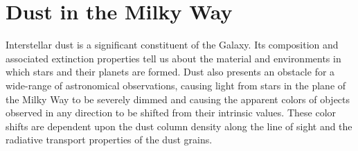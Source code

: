 %
%
%
%
%
%
%

\section{Dust in the Milky Way}
\def\secname{MW_Dust}\label{sec:\secname} %



Interstellar dust is a significant constituent of the Galaxy. Its composition and associated extinction
properties tell us about the material and environments in which stars and their planets are formed.
Dust also presents an obstacle for a wide-range of astronomical observations, causing light from
stars in the plane of the Milky Way to be severely dimmed and causing the apparent colors of
objects observed in any direction to be shifted from their intrinsic values. These color shifts
are dependent upon the dust column density along the line of sight and the radiative transport
properties of the dust grains.

